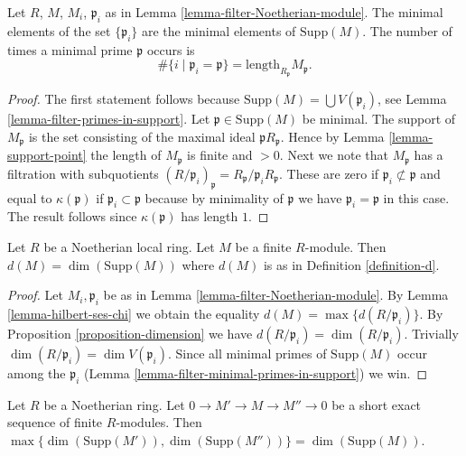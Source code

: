 \begin{lemma}
\label{lemma-filter-minimal-primes-in-support}
Let $R$, $M$, $M_i$, $\mathfrak p_i$ as in
Lemma \ref{lemma-filter-Noetherian-module}.
The minimal elements of the set $\{\mathfrak p_i\}$
are the minimal elements of $\text{Supp}(M)$.
The number of times a minimal prime $\mathfrak p$
occurs is
$$
\#\{i \mid \mathfrak p_i = \mathfrak p\}
=
\text{length}_{R_\mathfrak p} M_{\mathfrak p}.
$$
\end{lemma}

\begin{proof}
The first statement follows because
$\text{Supp}(M) = \bigcup V(\mathfrak p_i)$, see
Lemma \ref{lemma-filter-primes-in-support}.
Let $\mathfrak p \in \text{Supp}(M)$ be minimal.
The support of $M_{\mathfrak p}$ is the set
consisting of the maximal ideal $\mathfrak p R_{\mathfrak p}$.
Hence by Lemma \ref{lemma-support-point} the length
of $M_{\mathfrak p}$ is finite and $> 0$. Next we
note that $M_{\mathfrak p}$ has a filtration with subquotients
$
(R/\mathfrak p_i)_{\mathfrak p}
=
R_{\mathfrak p}/{\mathfrak p_i}R_{\mathfrak p}
$.
These are zero if $\mathfrak p_i \not \subset \mathfrak p$
and equal to $\kappa(\mathfrak p)$ if $\mathfrak p_i \subset
\mathfrak p$ because by minimality of $\mathfrak p$
we have $\mathfrak p_i = \mathfrak p$ in this case.
The result follows since $\kappa(\mathfrak p)$ has length $1$.
\end{proof}

\begin{lemma}
\label{lemma-support-dimension-d}
Let $R$ be a Noetherian local ring.
Let $M$ be a finite $R$-module.
Then $d(M) = \dim(\text{Supp}(M))$ where $d(M)$ is as in
Definition \ref{definition-d}.
\end{lemma}

\begin{proof}
Let $M_i, \mathfrak p_i$ be as in Lemma \ref{lemma-filter-Noetherian-module}.
By Lemma \ref{lemma-hilbert-ses-chi} we obtain the equality
$d(M) = \max \{ d(R/\mathfrak p_i) \}$. By
Proposition \ref{proposition-dimension} we have
$d(R/\mathfrak p_i) = \dim(R/\mathfrak p_i)$.
Trivially $\dim(R/\mathfrak p_i) = \dim V(\mathfrak p_i)$.
Since all minimal primes of $\text{Supp}(M)$ occur among
the $\mathfrak p_i$ (Lemma \ref{lemma-filter-minimal-primes-in-support}) we win.
\end{proof}

\begin{lemma}
\label{lemma-ses-dimension}
Let $R$ be a Noetherian ring. Let $0 \to M' \to M \to M'' \to 0$
be a short exact sequence of finite $R$-modules. Then
$\max\{\dim(\text{Supp}(M')), \dim(\text{Supp}(M''))\} =
\dim(\text{Supp}(M))$.
\end{lemma}

